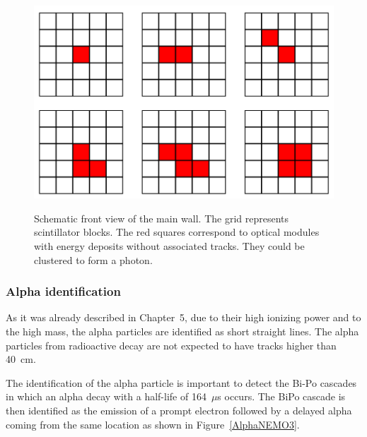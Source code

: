 \documentclass[main.tex]{subfiles}
\begin{document}
\begin{figure}[h!]
\centering
\includegraphics[scale=0.35]{pictures/Chap6/GammaCluster.png}
\label{GammaClusterSchema}
\caption{Schematic front view of the main wall. The grid represents scintillator blocks. The red squares correspond to optical modules with energy deposits without associated tracks. They could be clustered to form a photon.}
\end{figure}

\FloatBarrier

\subsubsection{Alpha identification}


\NI As it was already described in Chapter~5, due to their high ionizing power and to the high mass, the alpha particles are identified as short straight lines. The alpha particles from radioactive decay are not expected to have tracks higher than 40~cm.


\bigskip


\NI The identification of the alpha particle is important to detect the Bi-Po cascades in which an alpha decay with a half-life of 164~$\mu$s occurs. The BiPo cascade is then identified as the emission of a prompt electron followed by a delayed alpha coming from the same location as shown in Figure~\ref{AlphaNEMO3}.  
\end{document}
